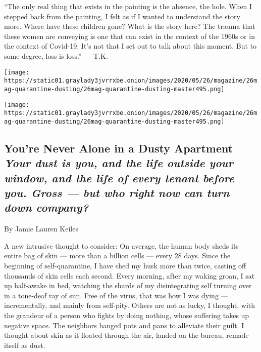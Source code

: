 ``The only real thing that exists in the painting is the absence, the
hole. When I stepped back from the painting, I felt as if I wanted to
understand the story more. Where have these children gone? What is the
story here? The trauma that these women are conveying is one that can
exist in the context of the 1960s or in the context of Covid-19. It's
not that I set out to talk about this moment. But to some degree, loss
is loss.'' --- T.K.

\texttt{[image: https://static01.graylady3jvrrxbe.onion/images/2020/05/26/magazine/26mag-quarantine-dusting/26mag-quarantine-dusting-master495.png]}

\texttt{[image: https://static01.graylady3jvrrxbe.onion/images/2020/05/26/magazine/26mag-quarantine-dusting/26mag-quarantine-dusting-master495.png]}

\hypertarget{youre-never-alone-in-a-dusty-apartment-your-dust-is-you-and-the-life-outside-your-window-and-the-life-of-every-tenant-before-you-gross--but-who-right-now-can-turn-down-company}{%
\subsection{\texorpdfstring{You're Never Alone in a Dusty Apartment
\emph{Your dust is you, and the life outside your window, and the life
of every tenant before you. Gross --- but who right now can turn down
company?}}{You're Never Alone in a Dusty Apartment Your dust is you, and the life outside your window, and the life of every tenant before you. Gross --- but who right now can turn down company?}}\label{youre-never-alone-in-a-dusty-apartment-your-dust-is-you-and-the-life-outside-your-window-and-the-life-of-every-tenant-before-you-gross--but-who-right-now-can-turn-down-company}}

By Jamie Lauren Keiles

A new intrusive thought to consider: On average, the human body sheds
its entire bag of skin --- more than a billion cells --- every 28 days.
Since the beginning of self-quarantine, I have shed my husk more than
twice, casting off thousands of skin cells each second. Every morning,
after my waking groan, I sat up half-awake in bed, watching the shards
of my disintegrating self turning over in a tone-deaf ray of sun. Free
of the virus, that was how I was dying --- incrementally, and mainly
from self-pity. Others are not as lucky, I thought, with the grandeur of
a person who fights by doing nothing, whose suffering takes up negative
space. The neighbors banged pots and pans to alleviate their guilt. I
thought about skin as it floated through the air, landed on the bureau,
remade itself as dust.

